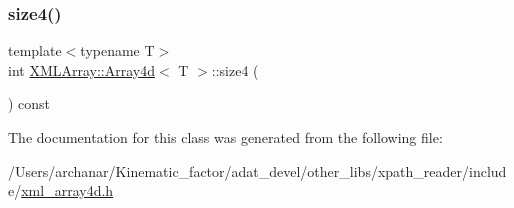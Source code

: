 \subsubsection{\texorpdfstring{size4()}{size4()}\hspace{0.1cm}{\footnotesize\ttfamily [2/2]}}
{\footnotesize\ttfamily template$<$typename T$>$ \\
int \mbox{\hyperlink{classXMLArray_1_1Array4d}{X\+M\+L\+Array\+::\+Array4d}}$<$ T $>$\+::size4 (\begin{DoxyParamCaption}{ }\end{DoxyParamCaption}) const\hspace{0.3cm}{\ttfamily [inline]}}



The documentation for this class was generated from the following file\+:\begin{DoxyCompactItemize}
\item 
/\+Users/archanar/\+Kinematic\+\_\+factor/adat\+\_\+devel/other\+\_\+libs/xpath\+\_\+reader/include/\mbox{\hyperlink{other__libs_2xpath__reader_2include_2xml__array4d_8h}{xml\+\_\+array4d.\+h}}\end{DoxyCompactItemize}
